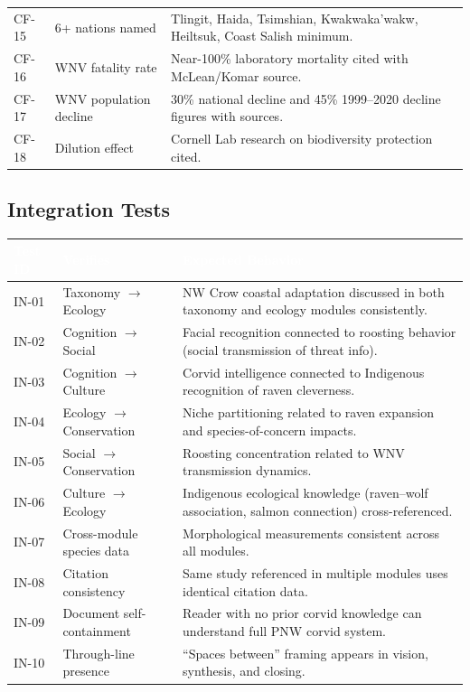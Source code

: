 \documentclass[11pt,letterpaper]{article}
\newcommand{\tableheader}[1]{\textbf{\sffamily\textcolor{white}{#1}}}
\begin{document}
\begin{center}
\begin{tabularx}{\textwidth}{C{1.2cm}L{3.5cm}X}
CF-15 & 6+ nations named & Tlingit, Haida, Tsimshian, Kwakwaka'wakw, Heiltsuk, Coast Salish minimum. \\
CF-16 & WNV fatality rate & Near-100\% laboratory mortality cited with McLean/Komar source. \\
CF-17 & WNV population decline & 30\% national decline and 45\% 1999--2020 decline figures with sources. \\
CF-18 & Dilution effect & Cornell Lab research on biodiversity protection cited. \\
\bottomrule
\end{tabularx}
\end{center}

\subsection{Integration Tests}

\begin{center}
\begin{tabularx}{\textwidth}{C{1.2cm}L{3.5cm}X}
\toprule
{}
\tableheader{Test ID} & \tableheader{Verifies} & \tableheader{Expected Behavior} \\
\midrule
IN-01 & Taxonomy $\rightarrow$ Ecology & NW Crow coastal adaptation discussed in both taxonomy and ecology modules consistently. \\
IN-02 & Cognition $\rightarrow$ Social & Facial recognition connected to roosting behavior (social transmission of threat info). \\
IN-03 & Cognition $\rightarrow$ Culture & Corvid intelligence connected to Indigenous recognition of raven cleverness. \\
IN-04 & Ecology $\rightarrow$ Conservation & Niche partitioning related to raven expansion and species-of-concern impacts. \\
IN-05 & Social $\rightarrow$ Conservation & Roosting concentration related to WNV transmission dynamics. \\
IN-06 & Culture $\rightarrow$ Ecology & Indigenous ecological knowledge (raven--wolf association, salmon connection) cross-referenced. \\
IN-07 & Cross-module species data & Morphological measurements consistent across all modules. \\
IN-08 & Citation consistency & Same study referenced in multiple modules uses identical citation data. \\
IN-09 & Document self-containment & Reader with no prior corvid knowledge can understand full PNW corvid system. \\
IN-10 & Through-line presence & ``Spaces between'' framing appears in vision, synthesis, and closing. \\
\bottomrule
\end{tabularx}
\end{center}
\end{document}
